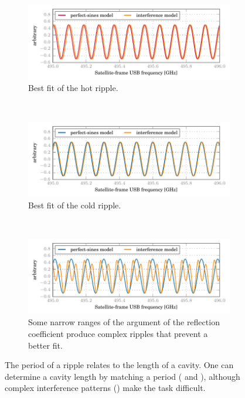 \begin{figure}
    \centering
    \begin{subfigure}{\linewidth}
        \centering
        \includegraphics{mars_25_interf_distance_fit_hot}
        \caption{Best fit of the hot ripple.}
        \label{fig:mars_25_interf_distance_fit_hot}
    \end{subfigure}%
    \\
    \begin{subfigure}{\linewidth}
        \centering
        \includegraphics{mars_25_interf_distance_fit_cold}
        \caption{Best fit of the cold ripple.}
        \label{fig:mars_25_interf_distance_fit_cold}
    \end{subfigure}%
    \\
    \begin{subfigure}{\linewidth}
        \centering
        \includegraphics{mars_25_interf_distance_fit_cold_poor}
        \caption{Some narrow ranges of the argument of the reflection coefficient produce complex ripples that prevent a better fit.}
        \label{fig:mars_25_interf_distance_fit_cold_poor}
    \end{subfigure}%
    \caption{
        The period of a ripple relates to the length of a cavity.
        One can determine a cavity length by matching a period 
        ( and ),
        although complex interference patterns () make the task difficult.
    }
    \label{fig:mars_25_interf_distance_fit}
\end{figure}


